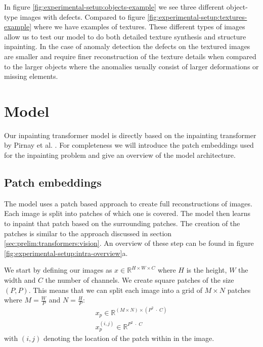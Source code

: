 In figure \ref{fig:experimental-setup:objects-example} we see three different object-type images with defects. Compared to figure \ref{fig:experimental-setup:textures-example} where we have examples of textures. These different types of images allow us to test our model to do both detailed texture synthesis and structure inpainting. In the case of anomaly detection the defects on the textured images are smaller and require finer reconstruction of the texture details when compared to the larger objects where the anomalies usually consist of larger deformations or missing elements.

\section{Model}
\label{sec:experimental-setup:model}

Our inpainting transformer model is directly based on the inpainting transformer by Pirnay et al. \cite{pirnay_inpainting_2021}. For completeness we will introduce the patch embeddings used for the inpainting problem and give an overview of the model architecture.

\subsection{Patch embeddings}
\label{subsec:experimental-setup:patch-embeddings}

The model uses a patch based approach to create full reconstructions of images. Each image is split into patches of which one is covered. The model then learns to inpaint that patch based on the surrounding patches. The creation of the patches is similar to the approach discussed in section \ref{sec:prelim:transformers:vision}. An overview of these step can be found in figure \ref{fig:experimental-setup:intra-overview}a.

We start by defining our images as $x \in \mathbb{R}^{H \times W \times C}$ where $H$ is the height, $W$ the width and $C$ the number of channels. We create square patches of the size $(P, P)$. This means that we can split each image into a grid of $M \times N$ patches where $M = \frac{W}{P}$ and $N = \frac{H}{P}$:
%
\begin{align}
    x_p \in \mathbb{R}^{(M \times N) \times (P^2 \; \cdot \; C)}\\
    x_p^{(i,j)} \in \mathbb{R}^{P^2 \; \cdot \; C}
\end{align}
%
with $(i, j)$ denoting the location of the patch within in the image.

